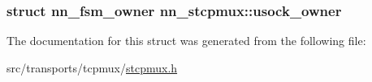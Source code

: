 \subsubsection[{usock\+\_\+owner}]{\setlength{\rightskip}{0pt plus 5cm}struct {\bf nn\+\_\+fsm\+\_\+owner} nn\+\_\+stcpmux\+::usock\+\_\+owner}\hypertarget{structnn__stcpmux_a86f66d320ddd64a0706a891eeb4e6be1}{}\label{structnn__stcpmux_a86f66d320ddd64a0706a891eeb4e6be1}


The documentation for this struct was generated from the following file\+:\begin{DoxyCompactItemize}
\item 
src/transports/tcpmux/\hyperlink{stcpmux_8h}{stcpmux.\+h}\end{DoxyCompactItemize}

